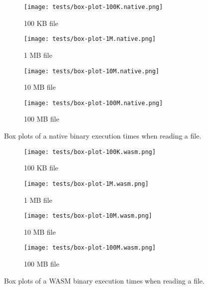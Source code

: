 \begin{figure}[ht!]
  \centering

  \begin{subfigure}[b]{0.49\textwidth}
    \centering
    \texttt{[image: tests/box-plot-100K.native.png]}
    \caption{100 KB file}
  \end{subfigure}
  \begin{subfigure}[b]{0.49\textwidth}
    \centering
    \texttt{[image: tests/box-plot-1M.native.png]}
    \caption{1 MB file}
  \end{subfigure}

  \begin{subfigure}[b]{0.49\textwidth}
    \centering
    \texttt{[image: tests/box-plot-10M.native.png]}
    \caption{10 MB file}
  \end{subfigure}
  \begin{subfigure}[b]{0.49\textwidth}
    \centering
    \texttt{[image: tests/box-plot-100M.native.png]}
    \caption{100 MB file}
  \end{subfigure}

  \caption{Box plots of a native binary execution times when reading a file.}
  \label{fig:distribution-reading-native}
\end{figure}

\begin{figure}[ht!]
  \centering

  \begin{subfigure}[b]{0.49\textwidth}
    \centering
    \texttt{[image: tests/box-plot-100K.wasm.png]}
    \caption{100 KB file}
  \end{subfigure}
  \begin{subfigure}[b]{0.49\textwidth}
    \centering
    \texttt{[image: tests/box-plot-1M.wasm.png]}
    \caption{1 MB file}
  \end{subfigure}

  \begin{subfigure}[b]{0.49\textwidth}
    \centering
    \texttt{[image: tests/box-plot-10M.wasm.png]}
    \caption{10 MB file}
  \end{subfigure}
  \begin{subfigure}[b]{0.49\textwidth}
    \centering
    \texttt{[image: tests/box-plot-100M.wasm.png]}
    \caption{100 MB file}
  \end{subfigure}

  \caption{Box plots of a WASM binary execution times when reading a file.}
  \label{fig:distribution-reading-wasm}
\end{figure}

